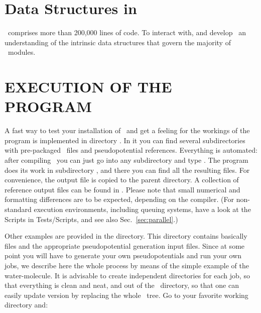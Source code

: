 \ifdeveloper
\section{Data Structures in \texorpdfstring{\siesta}{siesta}}

\siesta\ comprises more than 200,000 lines of code. To interact with,
and develop \siesta\ an understanding of the intrinsic data structures
that govern the majority of \siesta\ modules.

\fi


\section{EXECUTION OF THE PROGRAM}

A fast way to test your installation of \siesta\ and get a feeling for
the workings of the program is implemented in directory
. In it you can find several subdirectories
with pre-packaged \fdflib\ files and pseudopotential references. Everything
is automated: after compiling \siesta\ you can just go into any
subdirectory and type . The program does its work in
subdirectory , and there you can find all the resulting
files. For convenience, the output file is copied to the parent
directory. A collection of reference output files can be found in
. Please note that small numerical and
formatting differences are to be expected, depending on the compiler.
(For non-standard execution environments, including queuing systems,
have a look at the Scripts in Tests/Scripts, and see also
Sec.~\ref{sec:parallel}.)

Other examples are provided in the  directory. This
directory contains basically  files and the appropriate
pseudopotential generation input files. Since at some point you will
have to generate your own pseudopotentials and run your own jobs, we
describe here the whole process by means of the simple example of the
water-molecule. It is advisable to create independent directories for
each job, so that everything is clean and neat, and out of the
\siesta\ directory, so that one can easily update version by replacing
the whole \siesta\ tree. Go to your favorite working directory and:


